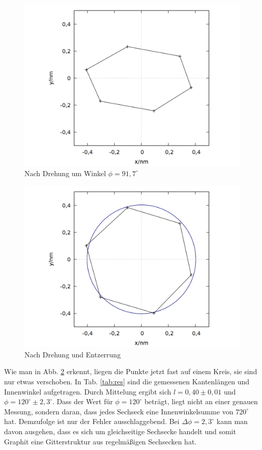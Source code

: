 \begin{figure}
\centering
\includegraphics[scale=0.3]{data/graphit/out_rotate_old.png}
\caption{Nach Drehung um Winkel $\phi = 91,7^\circ$}
\label{fig:fit1}
\end{figure}

\begin{figure}
\centering
\includegraphics[scale=0.3]{data/graphit/out_rotate.png}
\caption{Nach Drehung und Entzerrung}
\label{fig:fit2}
\end{figure}

Wie man in Abb. \ref{fig:fit2} erkennt, liegen die Punkte jetzt fast auf einem Kreis, sie sind nur etwas verschoben. In Tab. \ref{tab:res} sind die gemessenen Kantenlängen und Innenwinkel aufgetragen. Durch Mittelung ergibt sich $l = 0,40 \pm 0,01$ und $\phi = 120^\circ \pm 2,3^\circ$. Dass der Wert für $\phi = 120^\circ$ beträgt, liegt nicht an einer genauen Messung, sondern daran, dass jedes Sechseck eine Innenwinkelsumme von $720^\circ$ hat. Demzufolge ist nur der Fehler ausschlaggebend. Bei $\Delta\phi=2,3^\circ$ kann man davon ausgehen, dass es sich um gleichseitige Sechsecke handelt und somit Graphit eine Gitterstruktur aus regelmäßigen Sechsecken hat.\\

